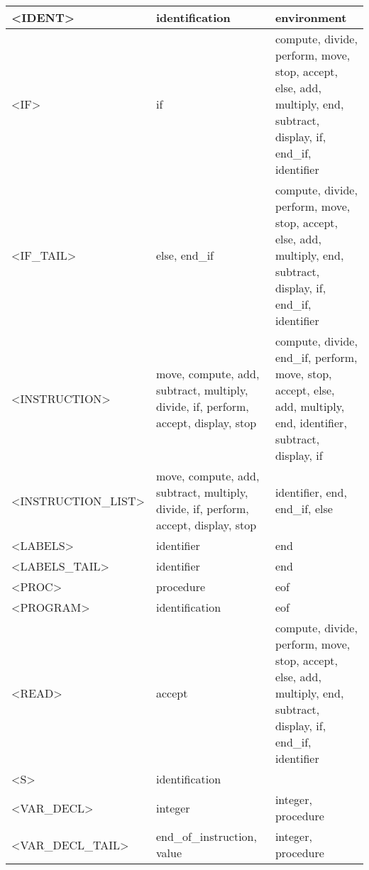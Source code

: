 \begin{tabular}{|l|l|l|}
<IDENT>              &   identification                                  &   environment                                      \\ \hline
<IF>                 &   if                                              &   compute, divide, perform, move, stop, accept, else, add, multiply, end, subtract, display, if, end\_if, identifier \\ \hline
<IF\_TAIL>            &   else, end\_if                                    &   compute, divide, perform, move, stop, accept, else, add, multiply, end, subtract, display, if, end\_if, identifier \\ \hline
<INSTRUCTION>        &   move, compute, add, subtract, multiply, divide, if, perform, accept, display, stop&   compute, divide, end\_if, perform, move, stop, accept, else, add, multiply, end, identifier, subtract, display, if \\ \hline
<INSTRUCTION\_LIST>   &   move, compute, add, subtract, multiply, divide, if, perform, accept, display, stop&   identifier, end, end\_if, else                    \\ \hline
<LABELS>             &   identifier                                      &   end                                              \\ \hline
<LABELS\_TAIL>        &   identifier                                      &   end                                              \\ \hline
<PROC>               &   procedure                                       &   eof                                              \\ \hline
<PROGRAM>            &   identification                                  &   eof                                              \\ \hline
<READ>               &   accept                                          &   compute, divide, perform, move, stop, accept, else, add, multiply, end, subtract, display, if, end\_if, identifier \\ \hline
<S>                  &   identification                                  &                                                       \\ \hline
<VAR\_DECL>           &   integer                                         &   integer, procedure                               \\ \hline
<VAR\_DECL\_TAIL>      &   end\_of\_instruction, value                       &   integer, procedure                               \\ \hline

\end{tabular}
